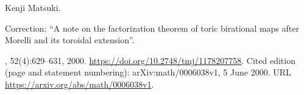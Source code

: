 Kenji Matsuki.

\newblock Correction: ``A note on the factorization theorem of toric
  birational maps after {Morelli} and its toroidal extension''.

, 52(4):629--631, 2000.
\newblock \url{https://doi.org/10.2748/tmj/1178207758}.
\newblock Cited edition (page and statement numbering): arXiv:math/0006038v1, 5 June 2000.
\newblock URL \url{https://arxiv.org/abs/math/0006038v1}.

